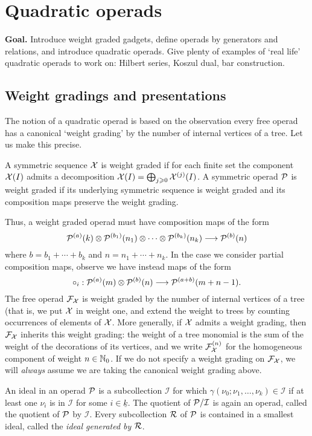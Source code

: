 \section{Quadratic operads}\label{lecture:quadraticops}

 \textbf{Goal.} Introduce weight graded gadgets,
 define operads by generators and relations, and
 introduce quadratic operads. Give plenty of examples
 of `real life' quadratic operads to work on:
 Hilbert series, Koszul dual, bar construction. 
 
 \subsection{Weight gradings and presentations}
 The notion of a quadratic operad is based on the observation
 every free operad has a canonical `weight grading' by the
 number of internal vertices of a tree. Let us make this
 precise.
 
\begin{definition}
A symmetric sequence $\mathcal{X}$ is weight graded if for
each finite set the component $\mathcal{X}(I)$ admits a 
decomposition $\mathcal{X}(I) = \bigoplus_{j\geqslant 0}
\mathcal{X}^{(j)}(I)$. A symmetric operad ${\mathcal{P}}$ is weight
graded if its underlying symmetric sequence
is weight graded and its composition maps
preserve the weight grading.
\end{definition}

Thus, a weight graded operad must have composition maps 
of the form
\[ {\mathcal{P}}^{(a)}(k) \otimes 
	{\mathcal{P}}^{(b_1)}(n_1) \otimes \cdots \otimes {\mathcal{P}}^{(b_k)}(n_k)
	 	\longrightarrow {\mathcal{P}}^{(b)}(n) \]
where $b=b_1+\cdots+b_k$ and $n = n_1+\cdots+n_k$. In the
case we consider partial composition maps, observe we have
instead maps of the form
\[\circ_i :  {\mathcal{P}}^{(a)}(m)\otimes  {\mathcal{P}}^{(b)}(n)
	\longrightarrow  {\mathcal{P}}^{(a+b)}(m+n-1). \] 
The free operad $\mathcal{F}_{\mathcal{X}}$ is weight graded by the number
of internal vertices of a tree (that is, we put $\mathcal{X}$ in
weight one, and extend the weight to trees by counting 
occurrences of elements of $\mathcal{X}$. More generally, if
$\mathcal{X}$ admits a weight grading, then $\mathcal{F}_{\mathcal{X}}$ inherits
this weight grading: the weight of a tree monomial is the
sum of the weight of the decorations of its vertices,
 and we write $\mathcal{F}_{\mathcal{X}}^{(n)}$ for the
homogeneous component of weight $n\in\mathbb N_0$. If we do
not specify a weight grading on $\mathcal{F}_{\mathcal{X}}$, we will 
\emph{always} assume we are taking the canonical weight grading above.


\begin{definition} An ideal in an operad ${\mathcal{P}}$
is a subcollection $\mathcal{I}$ for which
 $\gamma(\nu_0;\nu_1,\ldots,\nu_k)\in \mathcal{I}$ if at least one $\nu_i$ is in 
$\mathcal I$ for some $i\in \underline{k}$.
The quotient of ${\mathcal{P}}/\mathcal{I}$ is again an
operad, called the quotient of ${\mathcal{P}}$ 
by $\mathcal{I}$. Every subcollection $\mathcal{R}$
of ${\mathcal{P}}$ is contained in a smallest
ideal, called the \emph{ideal generated by $\mathcal{R}$}.
\end{definition}

